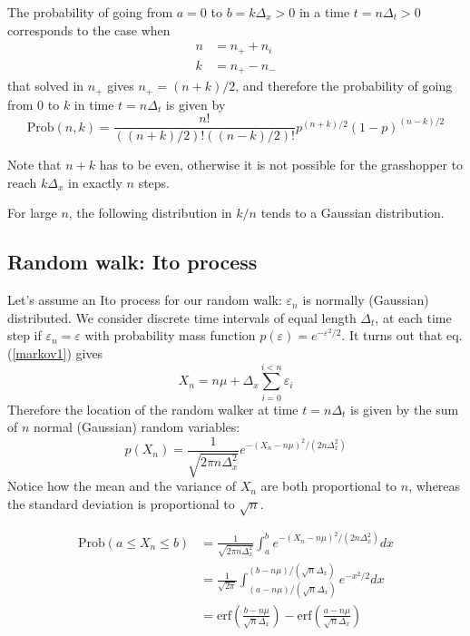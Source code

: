 \documentclass[justified,sixbynine]{tufte-book}
\theoremstyle{plain}%
\theoremstyle{definition}
\theoremstyle{remark}
\begin{document}
\begin{fullwidth}
The probability of going from $a=0$ to $b=k\Delta _x>0$ in a time $t=n\Delta
_t>0$ corresponds to the case when
\begin{align}
n &= n_{+}+n_i \\
k &= n_{+}-n_{-}
\end{align}
that solved in $n_{+}$ gives $n_{+}=(n+k)/2$, and therefore the probability
of going from $0$ to $k$ in time $t=n\Delta _t$ is given by
\begin{equation}
\textrm{Prob}(n,k)=\frac{n!}{((n+k)/2)!((n-k)/2)!}p^{(n+k)/2}(1-p)^{(n-k)/2}
\end{equation}

Note that $n+k$ has to be even, otherwise it is not possible for the
grasshopper to reach $k\Delta _x$ in exactly $n$ steps.

For large $n$, the following distribution in $k/n$ tends to a Gaussian distribution.

\goodbreak\subsection{Random walk: Ito process}

Let's assume an Ito process for our random walk: $\varepsilon _n$ is normally
(Gaussian) distributed. We consider discrete time intervals of equal length $%
\Delta _t$, at each time step if $\varepsilon _n=\varepsilon $ with
probability mass function $p(\varepsilon )=e^{-\varepsilon ^2/2}$. It turns
out that eq.(\ref{markov1}) gives
\begin{equation}
X_n = n \mu + \Delta _x\sum_{i=0}^{i<n}\varepsilon _i
\end{equation}
Therefore the location of the random walker at time $t=n\Delta _t$ is given
by the sum of $n$ normal (Gaussian) random variables:
\begin{equation}
p(X_n)=\frac 1{\sqrt{2\pi n\Delta _x^2}}e^{-(X_n - n\mu)^2/(2n\Delta _x^2)}
\end{equation}
Notice how the mean and the variance of $X_n$ are both proportional
to $n$, whereas the standard deviation is proportional to $\sqrt{n}$.

\begin{align}
\textrm{Prob}(a \leq X_n\leq b) &= \frac 1{\sqrt{2\pi n\Delta _x^2}}\int_a^be^{-(X_n - n\mu)^2/(2n%
\Delta _x^2)}dx \\
&= \frac 1{\sqrt{2\pi }}\int_{(a-n\mu)/(\sqrt{n}\Delta _x)}^{(b-n\mu)/(\sqrt{n}\Delta
_x)}e^{-x^2/2}dx \\
&= \textrm{erf}(\frac {b-n\mu}{\sqrt{n}\Delta _x})-\textrm{erf}(\frac {a-n\mu}{\sqrt{n}\Delta
_x})
\end{align}


\end{fullwidth}
\end{document}
